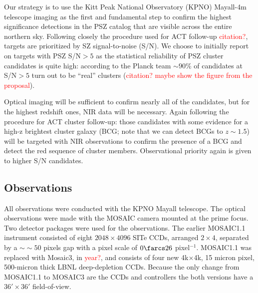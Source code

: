 \documentclass[apj, revtex4]{emulateapj}
\newcommand{\editorial}[1]{\textcolor{red}{#1}}
\begin{document}
Our strategy is to use the Kitt Peak National Observatory (KPNO) Mayall-4m telescope imaging as the first and fundamental step to confirm the highest significance detections in the PSZ catalog that are visible across the entire northern sky. Following closely the procedure used for ACT follow-up \editorial{citation?}, targets are prioritized by SZ signal-to-noise (S/N). We choose to initially report on targets with PSZ S/N$>5$ as the statistical reliability of PSZ cluster candidates is quite high: according to the Planck team $\sim90$\% of candidates at S/N$>5$ turn out to be ``real'' clusters (\editorial{citation? maybe show the figure from the proposal}).



Optical imaging will be sufficient to confirm nearly all of the candidates, but for the highest redshift ones, NIR data will be necessary. Again following the procedure for ACT cluster follow-up: those candidates with some evidence for a high-z brightest cluster galaxy (BCG; note that we can detect BCGs to $z \sim 1.5$) will be targeted with NIR observations to confirm the presence of a BCG and detect the red sequence of cluster members. Observational priority again is given to higher S/N candidates. 

\subsection{Observations}\label{sec: observations}
All observations were conducted with the KPNO Mayall telescope. The optical observations were made with the MOSAIC camera mounted at the prime focus. Two detector packages were used for the observations. The earlier MOSAIC1.1 instrument consisted of eight $2048\times4096$ SITe CCDs, arranged $2\times4$, separated by a $∼\sim50$ pixels gap with a pixel scale of $0\farcs26$ pixel$^{-1}$. MOSAIC1.1 was replaced with Mosaic3, in \editorial{year?},  and consists of four new 4k$\times$4k, 15 micron pixel, 500-micron thick LBNL deep-depletion CCDs. Because the only change from MOSAIC1.1 to MOSAIC3 are the CCDs and controllers the both versions have a $36' \times 36'$ field-of-view.
\end{document}
